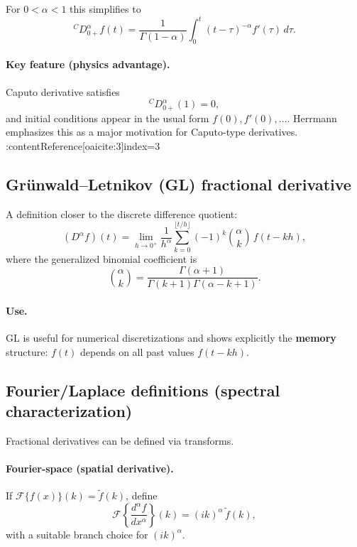 For $0<\alpha<1$ this simplifies to
\begin{equation}
{}^{C}D_{0+}^\alpha f(t)
=
\frac{1}{\Gamma(1-\alpha)}
\int_0^t (t-\tau)^{-\alpha}f'(\tau)\,d\tau.
\end{equation}

\paragraph{Key feature (physics advantage).}
Caputo derivative satisfies
\begin{equation}
{}^{C}D_{0+}^\alpha (1)=0,
\end{equation}
and initial conditions appear in the usual form $f(0),f'(0),\dots$.
Herrmann emphasizes this as a major motivation for Caputo-type derivatives. :contentReference[oaicite:3]{index=3}


\subsection{Grünwald--Letnikov (GL) fractional derivative}
A definition closer to the discrete difference quotient:
\begin{equation}
\boxed{
(D^\alpha f)(t)
=
\lim_{h\to 0^+}\frac{1}{h^\alpha}
\sum_{k=0}^{\lfloor t/h\rfloor}(-1)^k\binom{\alpha}{k}\,f(t-kh),
}
\end{equation}
where the generalized binomial coefficient is
\begin{equation}
\binom{\alpha}{k}=\frac{\Gamma(\alpha+1)}{\Gamma(k+1)\Gamma(\alpha-k+1)}.
\end{equation}

\paragraph{Use.}
GL is useful for numerical discretizations and shows explicitly the \textbf{memory}
structure: $f(t)$ depends on all past values $f(t-kh)$.


\subsection{Fourier/Laplace definitions (spectral characterization)}
Fractional derivatives can be defined via transforms.

\paragraph{Fourier-space (spatial derivative).}
If $\mathcal{F}\{f(x)\}(k)=\tilde f(k)$, define
\begin{equation}
\mathcal{F}\left\{\frac{d^\alpha f}{dx^\alpha}\right\}(k)
=
(ik)^\alpha\,\tilde f(k),
\end{equation}
with a suitable branch choice for $(ik)^\alpha$.

